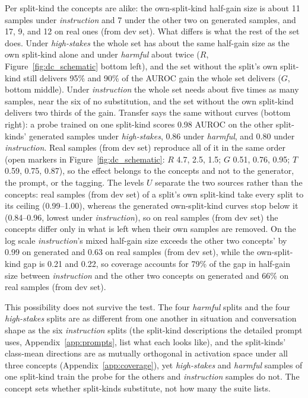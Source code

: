 \documentclass{article} %
\newcommand{\hs}{\emph{high-stakes}}
\newcommand{\harm}{\emph{harmful}}
\newcommand{\instr}{\emph{instruction}}
\begin{document}
Per split-kind the concepts are alike: the own-split-kind half-gain size is about 11 samples under \instr{} and 7 under the other two on generated samples, and 17, 9, and 12 on real ones (from dev set). What differs is what the rest of the set does. Under \hs{} the whole set has about the same half-gain size as the own split-kind alone and under \harm{} about twice ($R$, Figure~\ref{fig:dc_schematic} bottom left), and the set without the split's own split-kind still delivers 95\% and 90\% of the AUROC gain the whole set delivers ($G$, bottom middle). Under \instr{} the whole set needs about five times as many samples, near the six of no substitution, and the set without the own split-kind delivers two thirds of the gain. Transfer says the same without curves (bottom right): a probe trained on one split-kind scores 0.98 AUROC on the other split-kinds' generated samples under \hs{}, 0.86 under \harm{}, and 0.80 under \instr{}. Real samples (from dev set) reproduce all of it in the same order (open markers in Figure~\ref{fig:dc_schematic}: $R$ 4.7, 2.5, 1.5; $G$ 0.51, 0.76, 0.95; $T$ 0.59, 0.75, 0.87), so the effect belongs to the concepts and not to the generator, the prompt, or the tagging. The levels $U$ separate the two sources rather than the concepts: real samples (from dev set) of a split's own split-kind take every split to its ceiling (0.99--1.00), whereas the generated own-split-kind curves stop below it (0.84--0.96, lowest under \instr{}), so on real samples (from dev set) the concepts differ only in what is left when their own samples are removed. On the log scale \instr{}'s mixed half-gain size exceeds the other two concepts' by 0.99 on generated and 0.63 on real samples (from dev set), while the own-split-kind gap is 0.21 and 0.22, so coverage accounts for 79\% of the gap in half-gain size between \instr{} and the other two concepts on generated and 66\% on real samples (from dev set).

This possibility does not survive the test. The four \harm{} splits and the four \hs{} splits are as different from one another in situation and conversation shape as the six \instr{} splits (the split-kind descriptions the detailed prompt uses, Appendix~\ref{app:prompts}, list what each looks like), and the split-kinds' class-mean directions are as mutually orthogonal in activation space under all three concepts (Appendix~\ref{app:coverage}), yet \hs{} and \harm{} samples of one split-kind train the probe for the others and \instr{} samples do not. The concept sets whether split-kinds substitute, not how many the suite lists.
\end{document}
